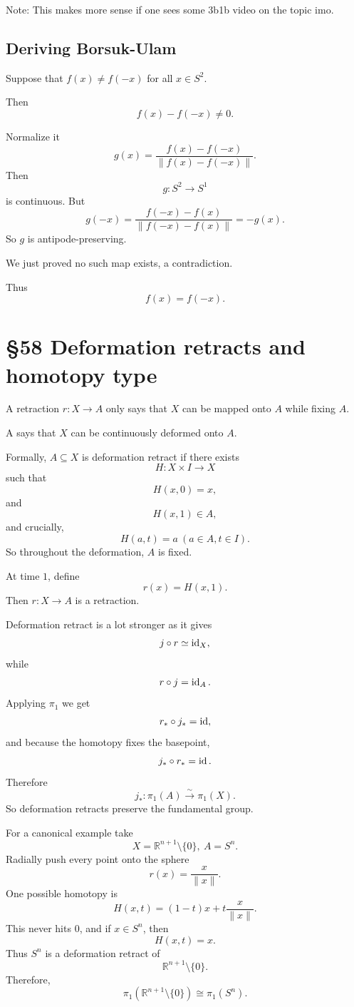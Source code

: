 \documentclass[11pt]{article}
\begin{document}
Note: This makes more sense if one sees some 
3b1b video on the topic imo. 

\subsection{Deriving Borsuk-Ulam}

Suppose that $f(x) \neq f(-x)$ for 
all $x \in S^2$. 

Then 
\[
    f(x) - f(-x) \neq 0. 
\]

Normalize it 
\[
    g(x) = \frac{f(x) - f(-x)}{\|f(x) - f(-x)\|}. 
\]
Then 
\[
    g : S^2 \to S^1 
\]
is continuous. 
But 
\[
    g(-x) = \frac{f(-x) - f(x)}{\|f(-x) - f(x)\|} 
    = -g(x).
\]
So $g$ is antipode-preserving. 

We just proved no such map exists, a contradiction. 

Thus 
\[
    f(x) = f(-x). 
\]

\section{\S58 Deformation retracts and homotopy type}

A retraction $r : X \to A$ only 
says that $X$ can be mapped onto $A$ while fixing $A$. 

A  says that $X$ 
can be continuously deformed onto $A$. 

Formally, $A \subseteq X$ is deformation retract if 
there exists 
\[
    H : X \times I \to X 
\]
such that 
\[
    H(x,0) = x, 
\]
and 
\[
    H(x,1) \in A, 
\]
and crucially, 
\[
    H(a,t) = a \ (a \in A, t \in I). 
\]
So throughout the deformation, $A$ is fixed.  

At time $1$, define 
\[
    r(x) = H(x,1). 
\]
Then $r : X \to A$ is a retraction. 

Deformation retract is a lot stronger as it gives 
\[
    j \circ r \simeq \operatorname{id}_X, 
\]
while 
\[
    r \circ j = \operatorname{id}_A. 
\]
Applying $\pi_1$ we get 
\[
    r_* \circ j_* = \operatorname{id}, 
\]
and because the homotopy fixes the basepoint, 
\[
    j_* \circ r_* = \operatorname{id}. 
\]
Therefore 
\[
    j_* : \pi_1(A) \overset\sim\longrightarrow 
    \pi_1(X). 
\]
So deformation retracts preserve the fundamental group. 

For a canonical example take 
\[
    X = \mathbb R^{n+1} \setminus \{0\}, 
    \ A = S^n. 
\]
Radially push every point onto the sphere 
\[
    r(x) = \frac{x}{\|x\|}. 
\]
One possible homotopy is 
\[
    H(x,t) = (1-t)x + t \frac{x}{\|x\|}. 
\]
This never hits $0$, and if $x \in S^n$, then 
\[
    H(x,t) = x. 
\]
Thus $S^n$ is a deformation retract of 
\[
    \mathbb R^{n+1}\setminus\{0\}. 
\]
Therefore, 
\[
    \pi_1(\mathbb R^{n+1}\setminus \{0\})
    \cong \pi_1(S^n). 
\]
\end{document}
